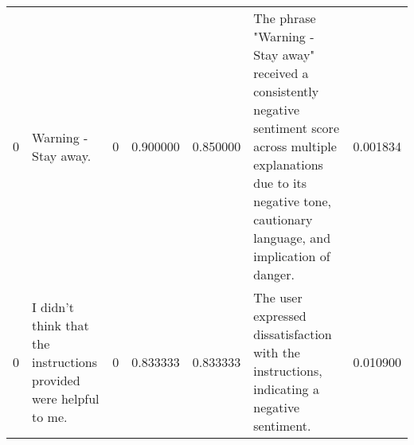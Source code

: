 \begin{tabular}{rlrrrlr}
0 & Warning - Stay away. & 0 & 0.900000 & 0.850000 & The phrase "Warning - Stay away" received a consistently negative sentiment score across multiple explanations due to its negative tone, cautionary language, and implication of danger. & 0.001834 \\
0 & I didn't think that the instructions provided were helpful to me. & 0 & 0.833333 & 0.833333 & The user expressed dissatisfaction with the instructions, indicating a negative sentiment. & 0.010900 \\
\bottomrule
\end{tabular}
